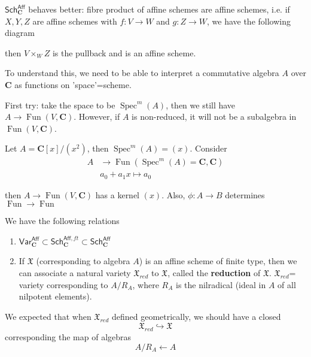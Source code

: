 \documentclass[
11pt, %
letterpaper， %
oneside, %
headinclude,footinclude, %
BCOR5mm, %
]{scrartcl}
\newcommand{\C}{{\mathbf{C}}}
\newcommand{\var}{\mathsf{Var}}
\newcommand{\sch}{\mathsf{Sch}}
\newcommand{\aff}{\mathsf{Aff}}
\newcommand{\fun}{\operatorname{Fun}}
\newcommand{\spec}{\operatorname{Spec}}
\begin{document}
$\sch^{\aff}_{\C}$ behaves better: fibre product of affine schemes are affine schemes, i.e. if $X, Y, Z$ are affine schemes with $f:V\to W$ and $g:Z\to W$, we have the following diagram
\begin{center}
\end{center}
then $V\times_{W}Z $ is the pullback and is an affine scheme.

To understand this, we need to be able to interpret a commutative algebra $A$ over $\C$ as functions on 'space'=scheme.

First try: take the space to be $\spec^{m}(A)$, then we still have	$A\to  \fun(V,\C)$. However, if $A$ is non-reduced, it will not be a subalgebra in $\fun(V,\C)$.

\begin{ex}
	Let $A=\C[x]/(x^2)$, then $\spec^m(A)=(x)$. Consider 
		\begin{align*}
	A&\longrightarrow \fun(\spec^m(A)=\C ,\C)\\
	&a_0+a_1 x \mapsto a_0
	\end{align*}
\end{ex}
then $A\to  \fun(V,\C)$ has a kernel $(x)$. Also, $\phi:A\to B$ determines $\fun \to \fun$
\begin{center}
\end{center}

\begin{prop}We have the following relations
  \begin{enumerate}
  	\item $\var^{\aff}_{\C} \subset \sch^{\aff, ft}_{\C}\subset \sch^{\aff}_{\C} $
  	\item If $\mathfrak{X}$ (corresponding to algebra $A$) is an affine scheme of finite type, then we can associate a natural variety $\mathfrak{X}_{red}$ to $\mathfrak{X}$, called the {\bfseries reduction} of $\mathfrak{X}$. $\mathfrak{X}_{red}$= variety corresponding to $A/R_A$, where $R_A$ is the nilradical (ideal in $A$ of all nilpotent elements).
  \end{enumerate}
\end{prop}
We expected that when $\mathfrak{X}_{red}$ defined geometrically, we should have a closed
\begin{equation*}
\mathfrak{X}_{red} \hookrightarrow	\mathfrak{X} 	
\end{equation*}
corresponding the map of algebras
\begin{equation*}
A/R_A \leftarrow A
\end{equation*}
\end{document}
